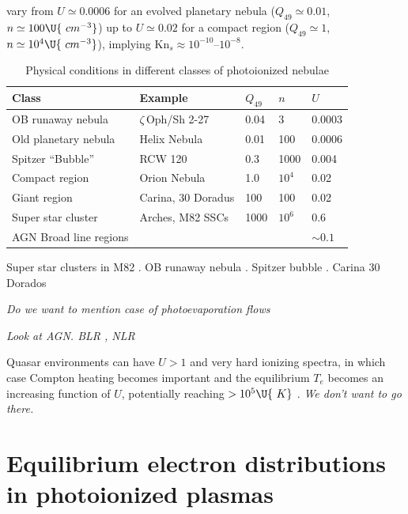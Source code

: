 \documentclass{emulateapj}
\newcommand\Kn{\ensuremath{\mathrm{Kn}}}
\newcommand\hii{\ion{H}{2}}
\begin{document}
vary from \(U \simeq 0.0006\)
for an evolved planetary nebula (\(Q_{49} \simeq 0.01\),
\(n \simeq 100\U{\ cm^{-3}}\))
up to \(U \simeq 0.02\)
for a compact \hii{} region (\(Q_{49} \simeq 1\),
\(n \simeq 10^{4}\U{\ cm^{-3}}\)),
implying \(\Kn_{s} \approx 10^{-10}\)--\(10^{-8}\).

\begin{table}
  \centering
  \caption{Physical conditions in different classes of photoionized nebulae}
  \label{tab:ion-param}
  \begin{tabular}{lllll}\hline
    Class & Example & \(Q_{49}\) & \(n\) & \(U\)\\ \hline
    OB runaway nebula & \(\zeta\)\,Oph/Sh 2-27 & 0.04 & 3 & 0.0003 \\
    Old planetary nebula & Helix Nebula & 0.01 & 100 & 0.0006 \\
    Spitzer ``Bubble'' & RCW 120 & 0.3 & 1000 & 0.004 \\
    Compact \hii{} region & Orion Nebula & 1.0 & \(10^4\) & 0.02 \\
    Giant \hii{} region & Carina, 30 Doradus &  100 & 100 & 0.02 \\ 
    Super star cluster & Arches, M82 SSCs & 1000 & \(10^6\) & 0.6 \\
    AGN Broad line regions & & & & \(\sim 0.1\) \\
    \hline
  \end{tabular}
\end{table}

Super star clusters in M82 \citep{McCrady:2007a, Krumholz:2009a}.  OB
runaway nebula \citep{Gvaramadze:2012a}.  Spitzer bubble
\citep{Deharveng:2009a}. Carina \citep{Smith:2008a} 30 Dorados \citep{Torres-Flores:2013a}

\textit{Do we want to mention case of photoevaporation flows}

\textit{Look at AGN.  BLR \citep{Baskin:2014a}, NLR
  \citep{Dopita:2002a, Groves:2004a} }

Quasar environments can have \(U > 1\)
and very hard ionizing spectra, in which case Compton heating becomes
important and the equilibrium \(T_e\)
becomes an increasing function of \(U\),
potentially reaching \(> 10^5\U{\ K}\)
\cite{Sazonov:2004a}.  \textit{We don't want to go there.}


\section{Equilibrium electron distributions in photoionized plasmas}
\label{sec:equil-electr-distr}
\newcommand\fu{\ensuremath{f_{\!u}}}
\newcommand\fuprime{\ensuremath{f_{\!u'}}}
\newcommand\XXdfudt{\ensuremath{\frac{\partial \fu}{\partial t}}}
\newcommand\Xdfudt{\ensuremath{\partial \fu/\partial t}}
\newcommand\Dfudt[1]{\biggl( \XXdfudt \biggr)_{\!\scriptscriptstyle\mathrm{#1}}}
\newcommand\dfudt[1]{\ensuremath{(\Xdfudt)_{\scriptscriptstyle\mathrm{#1}}}}
\end{document}
